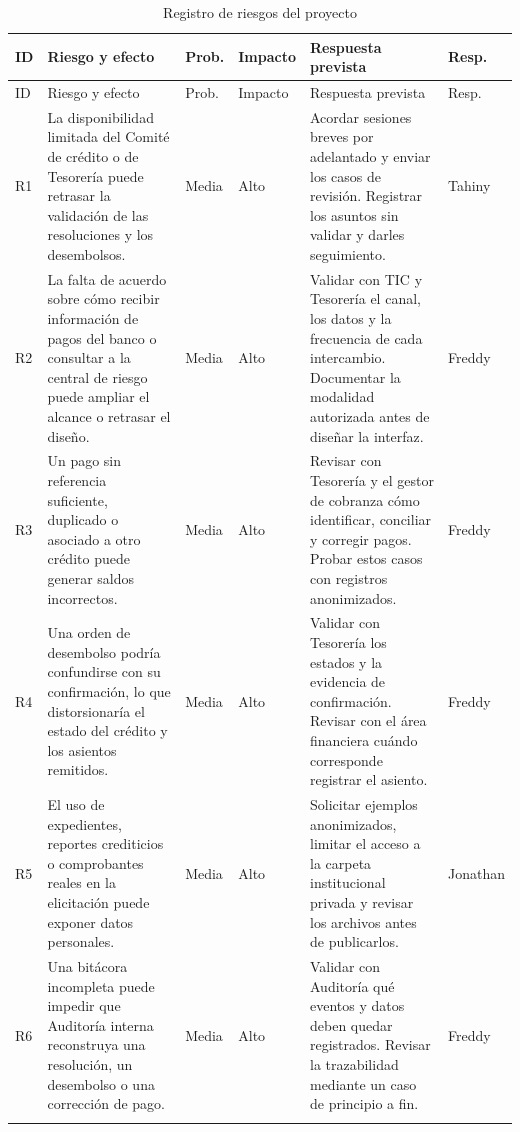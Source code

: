 \documentclass[11pt,a4paper]{article}
\begin{document}
\begingroup
\small
\setlength{\tabcolsep}{4pt}
\begin{longtable}{@{}L{.045}L{.27}L{.075}L{.08}L{.30}L{.10}@{}}
\caption{Registro de riesgos del proyecto}\label{tab:riesgos}\\
\toprule
ID & Riesgo y efecto & Prob. & Impacto & Respuesta prevista & Resp. \\
\midrule
\endfirsthead
\toprule
ID & Riesgo y efecto & Prob. & Impacto & Respuesta prevista & Resp. \\
\midrule
\endhead
\bottomrule
\endfoot

R1 & La disponibilidad limitada del Comité de crédito o de Tesorería
puede retrasar la validación de las resoluciones y los desembolsos.
& Media & Alto
& Acordar sesiones breves por adelantado y enviar los casos de revisión.
Registrar los asuntos sin validar y darles seguimiento.
& Tahiny \\
\addlinespace

R2 & La falta de acuerdo sobre cómo recibir información de pagos del
banco o consultar a la central de riesgo puede ampliar el alcance o
retrasar el diseño.
& Media & Alto
& Validar con TIC y Tesorería el canal, los datos y la frecuencia de
cada intercambio. Documentar la modalidad autorizada antes de diseñar
la interfaz.
& Freddy \\
\addlinespace

R3 & Un pago sin referencia suficiente, duplicado o asociado a otro
crédito puede generar saldos incorrectos.
& Media & Alto
& Revisar con Tesorería y el gestor de cobranza cómo identificar,
conciliar y corregir pagos. Probar estos casos con registros anonimizados.
& Freddy \\
\addlinespace

R4 & Una orden de desembolso podría confundirse con su confirmación,
lo que distorsionaría el estado del crédito y los asientos remitidos.
& Media & Alto
& Validar con Tesorería los estados y la evidencia de confirmación.
Revisar con el área financiera cuándo corresponde registrar el asiento.
& Freddy \\
\addlinespace

R5 & El uso de expedientes, reportes crediticios o comprobantes reales
en la elicitación puede exponer datos personales.
& Media & Alto
& Solicitar ejemplos anonimizados, limitar el acceso a la carpeta
institucional privada y revisar los archivos antes de publicarlos.
& Jonathan \\
\addlinespace

R6 & Una bitácora incompleta puede impedir que Auditoría interna
reconstruya una resolución, un desembolso o una corrección de pago.
& Media & Alto
& Validar con Auditoría qué eventos y datos deben quedar registrados.
Revisar la trazabilidad mediante un caso de principio a fin.
& Freddy \\
\addlinespace


\end{longtable}
\end{document}
